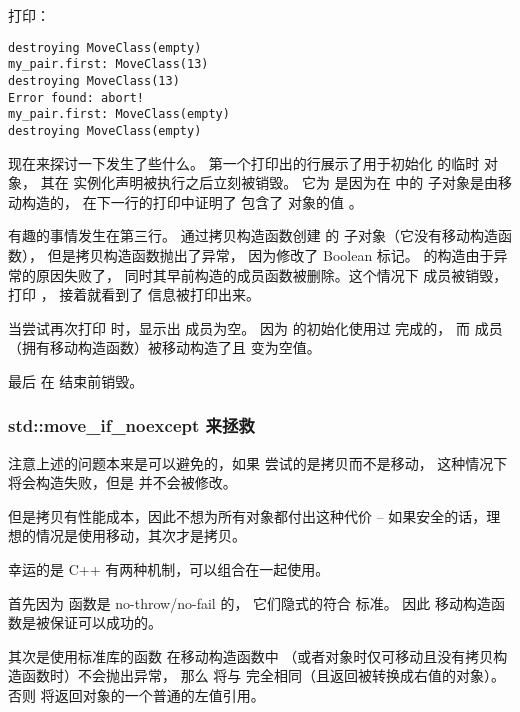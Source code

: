 \documentclass[../../LearnCpp.tex]{subfiles}
\begin{document}
打印：

\begin{lstlisting}
destroying MoveClass(empty)
my_pair.first: MoveClass(13)
destroying MoveClass(13)
Error found: abort!
my_pair.first: MoveClass(empty)
destroying MoveClass(empty)
\end{lstlisting}

现在来探讨一下发生了些什么。
第一个打印出的行展示了用于初始化  的临时  对象，
其在  实例化声明被执行之后立刻被销毁。
它为  是因为在  中的  子对象是由移动构造的，
在下一行的打印中证明了  包含了  对象的值 。

有趣的事情发生在第三行。
通过拷贝构造函数创建  的  子对象（它没有移动构造函数），
但是拷贝构造函数抛出了异常，
因为修改了 Boolean 标记。 的构造由于异常的原因失败了，
同时其早前构造的成员函数被删除。这个情况下  成员被销毁，
打印 ，
接着就看到了  信息被打印出来。

当尝试再次打印  时，显示出  成员为空。
因为  的初始化使用过  完成的，
而  成员（拥有移动构造函数）被移动构造了且  变为空值。

最后  在  结束前销毁。

\subsubsection*{std::move\_if\_noexcept 来拯救}

注意上述的问题本来是可以避免的，如果  尝试的是拷贝而不是移动，
这种情况下  将会构造失败，但是  并不会被修改。

但是拷贝有性能成本，因此不想为所有对象都付出这种代价 --
如果安全的话，理想的情况是使用移动，其次才是拷贝。

幸运的是 C++ 有两种机制，可以组合在一起使用。

首先因为  函数是 no-throw/no-fail 的，
它们隐式的符合  标准。
因此  移动构造函数是被保证可以成功的。

其次是使用标准库的函数  在移动构造函数中
（或者对象时仅可移动且没有拷贝构造函数时）不会抛出异常，
那么  将与  完全相同（且返回被转换成右值的对象）。
否则  将返回对象的一个普通的左值引用。
\end{document}
